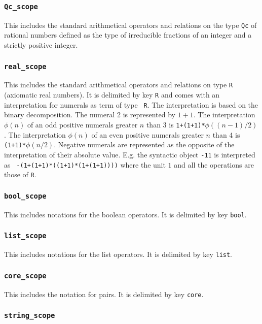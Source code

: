 \subsubsection{\tt Qc\_scope}

This includes the standard arithmetical operators and relations on the
type {\tt Qc} of rational numbers defined as the type of irreducible
fractions of an integer and a strictly positive integer.

\subsubsection{\tt real\_scope}

This includes the standard arithmetical operators and relations on
type {\tt R} (axiomatic real numbers). It is delimited by key {\tt R}
and comes with an interpretation for numerals as term of type {\tt
R}. The interpretation is based on the binary decomposition.  The
numeral 2 is represented by $1+1$.  The interpretation $\phi(n)$ of an
odd positive numerals greater $n$ than 3 is {\tt 1+(1+1)*$\phi((n-1)/2)$}.
The interpretation $\phi(n)$ of an even positive numerals greater $n$
than 4 is {\tt (1+1)*$\phi(n/2)$}.  Negative numerals are represented as the
opposite of the interpretation of their absolute value. E.g. the
syntactic object {\tt -11} is interpreted as {\tt
-(1+(1+1)*((1+1)*(1+(1+1))))} where the unit $1$ and all the operations are
those of {\tt R}.

\subsubsection{\tt bool\_scope}

This includes notations for the boolean operators. It is
delimited by key {\tt bool}.

\subsubsection{\tt list\_scope}

This includes notations for the list operators. It is
delimited by key {\tt list}.

\subsubsection{\tt core\_scope}

This includes the notation for pairs. It is delimited by key {\tt core}.

\subsubsection{\tt string\_scope}

